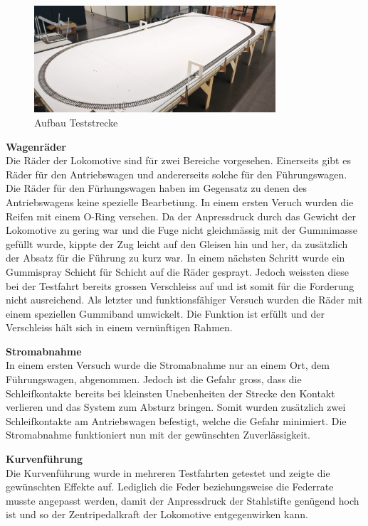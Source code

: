 \documentclass[../../main.tex]{subfiles}
\begin{document}
\begin{figure}[H]
    \centering
    \includegraphics[width=0.8\textwidth]{teststrecke1.PNG}
    \caption {Aufbau Teststrecke}
    \label{fig:teststrecke1}
  \end{figure}

\textbf{Wagenräder}\\
Die Räder der Lokomotive sind für zwei Bereiche vorgesehen. Einerseits gibt es Räder für den Antriebswagen und andererseits solche für den Führungswagen. Die Räder für den Fürhungswagen haben im Gegensatz zu denen des Antriebswagens keine spezielle Bearbetiung. In einem ersten Veruch wurden die Reifen mit einem O-Ring versehen. Da der Anpressdruck durch das Gewicht der Lokomotive zu gering war und die Fuge nicht gleichmässig mit der Gummimasse gefüllt wurde, kippte der Zug leicht auf den Gleisen hin und her, da zusätzlich der Absatz für die Führung zu kurz war. In einem nächsten Schritt wurde ein Gummispray Schicht für Schicht auf die Räder gesprayt. Jedoch weissten diese bei der Testfahrt bereits grossen Verschleiss auf und ist somit für die Forderung nicht ausreichend. Als letzter und funktionsfähiger Versuch wurden die Räder mit einem speziellen Gummiband umwickelt. Die Funktion ist erfüllt und der Verschleiss hält sich in einem vernünftigen Rahmen.

\textbf{Stromabnahme}\\
In einem ersten Versuch wurde die Stromabnahme nur an einem Ort, dem Führungswagen, abgenommen. Jedoch ist die Gefahr gross, dass die Schleifkontakte bereits bei kleinsten Unebenheiten der Strecke den Kontakt verlieren und das System zum Absturz bringen. Somit wurden zusätzlich zwei Schleifkontakte am Antriebswagen befestigt, welche die Gefahr minimiert. Die Stromabnahme funktioniert nun mit der gewünschten Zuverlässigkeit.

\textbf{Kurvenführung}\\
Die Kurvenführung wurde in mehreren Testfahrten getestet und zeigte die gewünschten Effekte auf. Lediglich die Feder beziehungsweise die Federrate musste angepasst werden, damit der Anpressdruck der Stahlstifte genügend hoch ist und so der Zentripedalkraft der Lokomotive entgegenwirken kann.
\end{document}
